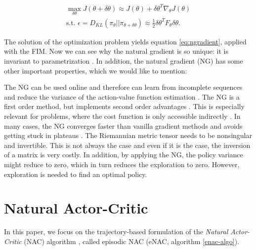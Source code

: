 \begin{align}
	\max_{\delta\theta} J(\theta + \delta\theta) \approx J(\theta) + \delta\theta^T\nabla_\theta J(\theta)\label{ng1}\\
	\text{s.t. } \epsilon = D_{KL}(\pi_{\theta} || \pi_{\theta + \delta\theta}) \approx \tfrac{1}{2} \delta\theta^T F_\theta \delta\theta\label{ng2}.
\end{align}

\noindent The solution of the optimization problem yields equation \ref{eq:ngradient}, applied with the FIM. Now we can see why the natural gradient is so unique: it is invariant to parametrization \citep{pascanu2013revisiting, peters2008natural}. In addition, the natural gradient (NG) has some other important properties, which we would like to mention:

\begin{itemize}
	\x {} The NG can be used online and therefore can learn from incomplete sequences and reduce the variance of the action-value function estimation \cite{pascanu2013revisiting, peters2008natural}.
	\x {} The NG is a first order method, but implements second order advantages \cite{pascanu2013revisiting}. This is especially relevant for problems, where the cost function is only accessible indirectly \cite{desjardins2013metric}.
	\x {} In many cases, the NG converges faster than vanilla gradient methods and avoids getting stuck in plateaus \cite{amari1998efficiently, sohl2012natural}.
	\x {} The Riemannian metric tensor needs to be nonsingular and invertible. This is not always the case and even if it is the case, the inversion of a matrix is very costly. In addition, by applying the NG, the policy variance might reduce to zero, which in turn reduces the exploration to zero. However, exploration is needed to find an optimal policy.
\end{itemize}

\section{Natural Actor-Critic}
\label{sec:nac}
In this paper, we focus on the trajectory-based formulation of the \textit{Natural Actor-Critic} (NAC) algorithm \citep{peters2005natural}, called episodic NAC (eNAC, algorithm \ref{enac-algo}).

